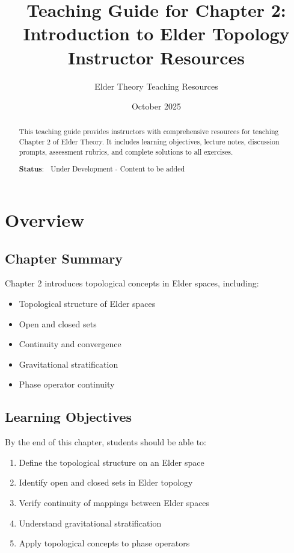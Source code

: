 \documentclass[12pt,a4paper]{article}
\title{\textbf{Teaching Guide for Chapter 2:}\\
\Large{Introduction to Elder Topology}\\
\large{Instructor Resources}}
\author{Elder Theory Teaching Resources}
\date{October 2025}
\begin{document}
\maketitle

\begin{abstract}
This teaching guide provides instructors with comprehensive resources for teaching Chapter 2 of Elder Theory. It includes learning objectives, lecture notes, discussion prompts, assessment rubrics, and complete solutions to all exercises.

\textbf{Status}: 🚧 Under Development - Content to be added
\end{abstract}

\tableofcontents
\newpage

\section{Overview}

\subsection{Chapter Summary}
Chapter 2 introduces topological concepts in Elder spaces, including:
\begin{itemize}
    \item Topological structure of Elder spaces
    \item Open and closed sets
    \item Continuity and convergence
    \item Gravitational stratification
    \item Phase operator continuity
\end{itemize}

\subsection{Learning Objectives}

By the end of this chapter, students should be able to:
\begin{enumerate}
    \item Define the topological structure on an Elder space
    \item Identify open and closed sets in Elder topology
    \item Verify continuity of mappings between Elder spaces
    \item Understand gravitational stratification
    \item Apply topological concepts to phase operators
\end{enumerate}
\end{document}
